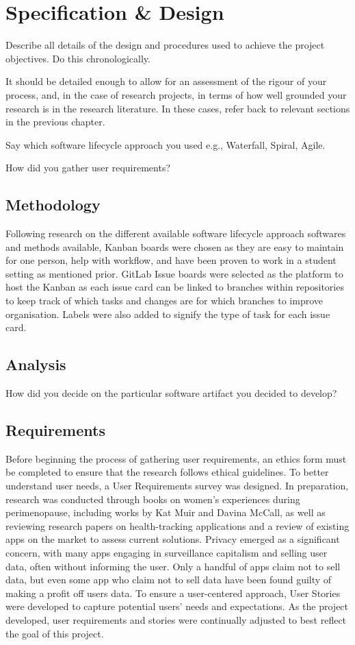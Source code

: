 
\section{Specification \& Design}\label{process}

Describe all details of the  design and procedures used to achieve the project objectives. Do this chronologically. 


It should be detailed enough to allow for an assessment of the rigour of your process, and, in the case of research projects, in terms of how well grounded your research is in the research literature. In these cases, refer back to relevant sections in the previous chapter.

Say which  software lifecycle approach you used e.g., Waterfall, Spiral, Agile. 

How did you gather user requirements?

\subsection{Methodology}
Following research on the different available software lifecycle approach softwares and methods available, Kanban boards were chosen as they are easy to maintain for one person, help with workflow, and have been proven to work in a student setting as mentioned prior. GitLab Issue boards were selected as the platform to host the Kanban as each issue card can be linked to branches within repositories to keep track of which tasks and changes are for which branches to improve organisation. Labels were also added to signify the type of task for each issue card.
 
\subsection{Analysis}
How did you decide on the particular software artifact you decided to develop?

\subsection{Requirements}
Before beginning the process of gathering user requirements, an ethics form must be completed to ensure that the research follows ethical guidelines. To better understand user needs, a User Requirements survey was designed. In preparation, research was conducted through books on women’s experiences during perimenopause, including works by Kat Muir and Davina McCall, as well as reviewing research papers on health-tracking applications and a review of existing apps on the market to assess current solutions. Privacy emerged as a significant concern, with many apps engaging in surveillance capitalism and selling user data, often without informing the user. Only a handful of apps claim not to sell data, but even some app who claim not to sell data have been found guilty of making a profit off users data. To ensure a user-centered approach, User Stories were developed to capture potential users’ needs and expectations. As the project developed, user requirements and stories were continually adjusted to best reflect the goal of this project.

